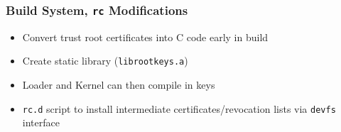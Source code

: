 \documentclass{beamer}
\begin{document}
\begin{frame}
  \frametitle{Build System, \texttt{rc} Modifications}
  \begin{itemize}
  \item Convert trust root certificates into C code early in build
  \item Create static library (\texttt{librootkeys.a})
  \item Loader and Kernel can then compile in keys
  \item \texttt{rc.d} script to install intermediate
    certificates/revocation lists via \texttt{devfs} interface
  \end{itemize}
\end{frame}
\end{document}

